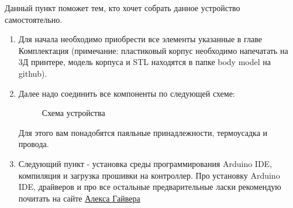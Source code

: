 \documentclass[12pt]{article}
\begin{document}
	Данный пункт поможет тем, кто хочет собрать данное устройство самостоятельно.
	\begin{enumerate}
		\item Для начала необходимо приобрести все элементы указанные в главе Комплектация (примечание: пластиковый корпус необходимо напечатать на 3Д принтере, модель корпуса и STL находятся в папке body model на github).
		
		\item Далее надо соединить все компоненты по следующей схеме:
		
		\begin{figure}[H]
			\caption{Схема устройства}
		\end{figure}
		Для этого вам понадобятся паяльные принадлежности, термоусадка и провода.
		
		\item Следующий пункт - установка среды программирования Arduino IDE, компиляция и загрузка прошивки на контроллер. Про установку Arduino IDE, драйверов и про все остальные предварительные ласки рекомендую почитать на сайте \href{https://alexgyver.ru/arduino-first/#Arduino_IDE}{Алекса Гайвера}

	\end{enumerate}
	
\end{document}
